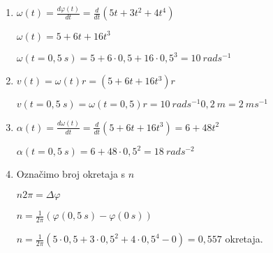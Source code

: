 
\begin{enumerate}[label=\alph*)]
\item 

$\omega(t)=\frac{d\varphi(t)}{dt} = \frac{d}{dt}(5t+3t^2+4t^4)$

$\omega(t)=5+6t+16t^3$

$\omega(t=0,5\ s)=5+6\cdot0,5+16\cdot 0,5^3=10\ rad s^{-1}$
\item

$v(t)=\omega(t)r=(5+6t+16t^3)r$

$v(t=0,5\ s)=\omega(t=0,5)r=10\ rad s^{-1}0,2\ m=2\ ms^{-1} $

\item

$\alpha(t)=\frac{d\omega(t)}{dt}=\frac{d}{dt}(5+6t+16t^3)=6+48t^2 $

$\alpha(t=0,5\ s)=6+48\cdot 0,5^2=18\ rad s^{-2}$

\item Označimo broj okretaja s $n$

$n 2\pi= \Delta\varphi$

$n=\frac{1}{2\pi}(\varphi(0,5\ s)-\varphi(0\ s))$

$n=\frac{1}{2\pi}(5\cdot0,5+3\cdot0,5^2+4\cdot0,5^4-0)=0,557$ okretaja.

\end{enumerate}
